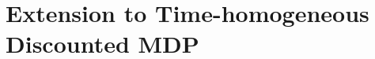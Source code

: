 \documentclass{article}
\numberwithin{equation}{section}
\begin{document}

\section{Extension to Time-homogeneous Discounted MDP}
\end{document}
